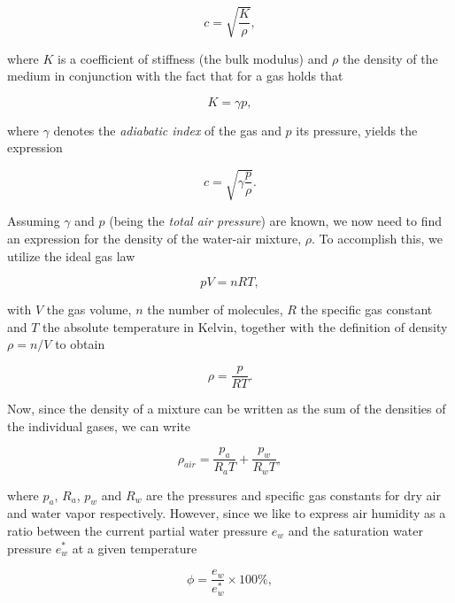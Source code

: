 \documentclass[11pt,titlepage]{report}
\begin{document}
\begin{equation}
	c = \sqrt{\frac{K}{\rho}},
\end{equation}

where $K$ is a coefficient of stiffness (the bulk modulus) and $\rho$ the density of the medium in conjunction with the fact that for a gas holds that

\begin{equation}
	K = \gamma p,
\end{equation}

where $\gamma$ denotes the \emph{adiabatic index} of the gas and $p$ its pressure, yields the expression

\begin{equation} \label{eq:c1}
	c = \sqrt{\gamma \frac{p}{\rho}}.
\end{equation}

Assuming $\gamma$ and $p$ (being the \emph{total air pressure}) are known, we now need to find an expression for the density of the water-air mixture, $\rho$.
To accomplish this, we utilize the ideal gas law

\begin{equation}
	p V = n R T,
\end{equation}

with $V$ the gas volume, $n$ the number of molecules, $R$ the specific gas constant and $T$ the absolute temperature in Kelvin, together with the definition of density $\rho = n / V$ to obtain

\begin{equation}
	\rho = \frac{p}{R T}.
\end{equation}

Now, since the density of a mixture can be written as the sum of the densities of the individual gases, we can write

\begin{equation} \label{eq:rho1}
	\rho_{air} = \frac{p_a}{R_a T} + \frac{p_w}{R_w T},
\end{equation}

where $p_a$, $R_a$, $p_w$ and $R_w$ are the pressures and specific gas constants for dry air and water vapor respectively. However, since we like to express air humidity as a ratio between the current partial water pressure $e_w$ and the saturation water pressure $e^*_w$ at a given temperature

\begin{equation}
	\phi = \frac{e_w}{e^*_w} \times 100\%,
\end{equation}
\end{document}
